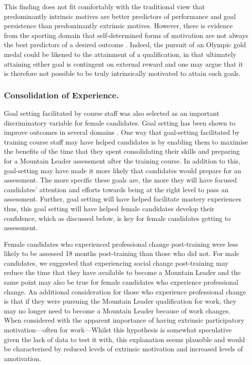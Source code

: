 \documentclass[
  12pt,
  a4paper,
]{book}
\begin{document}
This finding does not fit comfortably with the traditional view that predominantly intrinsic motives are better predictors of performance and goal persistence than predominantly extrinsic motives. However, there is evidence from the sporting domain that self-determined forms of motivation are not always the best predictors of a desired outcome \citep[e.g.,][]{Chantal1996, Fortier1995, Gullich2019, Hardy2017}. Indeed, the pursuit of an Olympic gold medal could be likened to the attainment of a qualification, in that ultimately attaining either goal is contingent on external reward and one may argue that it is therefore not possible to be truly intrinsically motivated to attain such goals.

\hypertarget{ml-pra-gta-female-consolidation-of-experience}{%
\subsubsection{Consolidation of Experience.}\label{ml-pra-gta-female-consolidation-of-experience}}

Goal setting facilitated by course staff was also selected as an important discriminatory variable for female candidates. Goal setting has been shown to improve outcomes in several domains \citep[see][ p 356]{Weinberg2014}. One way that goal-setting facilitated by training course staff may have helped candidates is by enabling them to maximise the benefits of the time that they spent consolidating their skills and preparing for a Mountain Leader assessment after the training course. In addition to this, goal-setting may have made it more likely that candidates would prepare for an assessment. The more specific these goals are, the more they will have focused candidates' attention and efforts towards being at the right level to pass an assessment. Further, goal setting will have helped facilitate mastery experiences thus, this goal setting will have helped female candidates develop their confidence, which as discussed below, is key for female candidates getting to assessment.

Female candidates who experienced professional change post-training were less likely to be assessed 18 months post-training than those who did not. For male candidates, we suggested that experiencing social change post-training may reduce the time that they have available to become a Mountain Leader and the same point may also be true for female candidates who experience professional change. An additional consideration for those who experience professional change is that if they were pursuing the Mountain Leader qualification for work, they may no longer need to become a Mountain Leader because of work changes. When considered with the apparent importance of having extrinsic participatory motivation---often for work---Whilst this hypothesis is somewhat speculative given the lack of data to test it with, this explanation seems plausible and would be characterised by reduced levels of extrinsic motivation and increased levels of amotivation.
\end{document}
